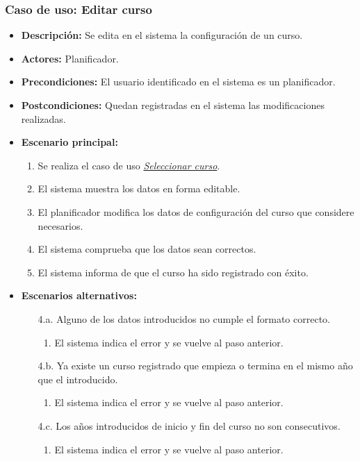\subsubsection*{Caso de uso: Editar curso}
\begin{itemize}
\item{\bf Descripción:} Se edita en el sistema la configuración de un curso.
\item{\bf Actores:} Planificador.
\item{\bf Precondiciones:} El usuario identificado en el sistema es un planificador.
\item{\bf Postcondiciones:} Quedan registradas en el sistema las modificaciones realizadas.
\item{\bf Escenario principal:}
  \begin{enumerate}
  \item Se realiza el caso de uso {\em \hyperref[select_curso]{Seleccionar curso}}.
  \item El sistema muestra los datos en forma editable.
  \item El planificador modifica los datos de configuración del curso que considere necesarios.
  \item El sistema comprueba que los datos sean correctos.
  \item El sistema informa de que el curso ha sido registrado con éxito.
  \end{enumerate}
\item{\bf Escenarios alternativos:}
  \begin{itemize}
  \item[4.a.] Alguno de los datos introducidos no cumple el formato correcto.
    \begin{enumerate}
    \item El sistema indica el error y se vuelve al paso anterior.
    \end{enumerate}
  \item[4.b.] Ya existe un curso registrado que empieza o termina en el mismo año que el introducido.
    \begin{enumerate}
    \item El sistema indica el error y se vuelve al paso anterior.
    \end{enumerate}
  \item[4.c.] Los años introducidos de inicio y fin del curso no son consecutivos.
    \begin{enumerate}
    \item El sistema indica el error y se vuelve al paso anterior.

\end{enumerate}
\end{itemize}
\end{itemize}
